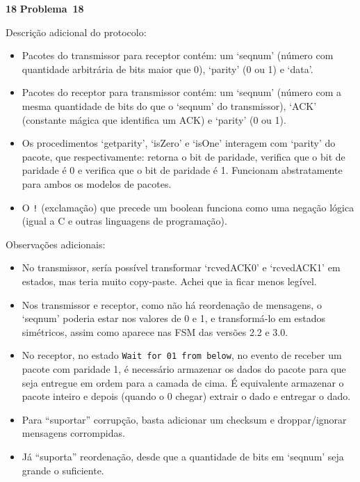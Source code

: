\documentclass{article}
\newcounter{exe-list}
\newenvironment{exe}[2][Problema]
    {\newcommand{\opt}{(Opcional)}%
    \newcommand{\sketch}[1]{{\bfseries Rascunho:} ##1}%
    \medskip\par\noindent\ifthenelse{\equal{#1}{}}
        {\textbf{\large #2}}
        {\textbf{\large #1~#2}}%
    \medskip\par\noindent}
    {\medskip}
\begin{document}
\begin{exe}{18}
    Descrição adicional do protocolo:
    \begin{itemize}
        \item Pacotes do transmissor para receptor contém:
            um `seqnum'
            (número com quantidade arbitrária de bits maior que 0),
            `parity' (0 ou 1) e `data'.
        \item Pacotes do receptor para transmissor contém:
            um `seqnum'
            (número com a mesma quantidade de bits do
            que o `seqnum' do transmissor),
            `ACK' (constante mágica que identifica um ACK) e
            `parity' (0 ou 1).
        \item Os procedimentos `getparity', `isZero' e `isOne'
            interagem com `parity' do pacote, que respectivamente:
            retorna o bit de paridade,
            verifica que o bit de paridade é 0 e
            verifica que o bit de paridade é 1.
            Funcionam abstratamente para ambos os modelos de pacotes.
        \item O \texttt{!} (exclamação) que precede um boolean
            funciona como uma negação lógica
            (igual a C e outras linguagens de programação).
    \end{itemize}

    Observações adicionais:
    \begin{itemize}
        \item No transmissor,
            sería possível transformar `rcvedACK0' e `rcvedACK1'
            em estados, mas teria muito copy-paste.
            Achei que ia ficar menos legível.
        \item Nos transmissor e receptor,
            como não há reordenação de mensagens,
            o `seqnum' poderia estar nos valores de 0 e 1,
            e transformá-lo em estados simétricos,
            assim como aparece nas FSM das versões 2.2 e 3.0.
        \item No receptor,
            no estado \texttt{Wait for 01 from below},
            no evento de receber um pacote com paridade 1,
            é necessário armazenar os dados do pacote
            para que seja entregue em ordem para a camada de cima.
            É equivalente armazenar o pacote inteiro
            e depois (quando o 0 chegar)
            extrair o dado e entregar o dado.
        \item Para ``suportar'' corrupção,
            basta adicionar um checksum e
            droppar/ignorar mensagens corrompidas.
        \item Já ``suporta'' reordenação,
            desde que a quantidade de bits em `seqnum'
            seja grande o suficiente.
    \end{itemize}
\end{exe}
\end{document}
